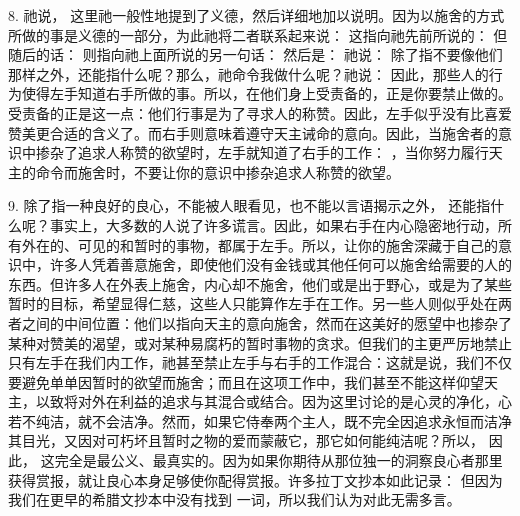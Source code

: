 8.  祂说， 这里祂一般性地提到了义德，然后详细地加以说明。因为以施舍的方式所做的事是义德的一部分，为此祂将二者联系起来说： 这指向祂先前所说的： 但随后的话： 则指向祂上面所说的另一句话： 然后是： 祂说： 除了指不要像他们那样之外，还能指什么呢？那么，祂命令我做什么呢？祂说：  因此，那些人的行为使得左手知道右手所做的事。所以，在他们身上受责备的，正是你要禁止做的。受责备的正是这一点：他们行事是为了寻求人的称赞。因此，左手似乎没有比喜爱赞美更合适的含义了。而右手则意味着遵守天主诫命的意向。因此，当施舍者的意识中掺杂了追求人称赞的欲望时，左手就知道了右手的工作： ，当你努力履行天主的命令而施舍时，不要让你的意识中掺杂追求人称赞的欲望。\par

9.  除了指一种良好的良心，不能被人眼看见，也不能以言语揭示之外， 还能指什么呢？事实上，大多数的人说了许多谎言。因此，如果右手在内心隐密地行动，所有外在的、可见的和暂时的事物，都属于左手。所以，让你的施舍深藏于自己的意识中，许多人凭着善意施舍，即使他们没有金钱或其他任何可以施舍给需要的人的东西。但许多人在外表上施舍，内心却不施舍，他们或是出于野心，或是为了某些暂时的目标，希望显得仁慈，这些人只能算作左手在工作。另一些人则似乎处在两者之间的中间位置：他们以指向天主的意向施舍，然而在这美好的愿望中也掺杂了某种对赞美的渴望，或对某种易腐朽的暂时事物的贪求。但我们的主更严厉地禁止只有左手在我们内工作，祂甚至禁止左手与右手的工作混合：这就是说，我们不仅要避免单单因暂时的欲望而施舍；而且在这项工作中，我们甚至不能这样仰望天主，以致将对外在利益的追求与其混合或结合。因为这里讨论的是心灵的净化，心若不纯洁，就不会洁净。然而，如果它侍奉两个主人，既不完全因追求永恒而洁净其目光，又因对可朽坏且暂时之物的爱而蒙蔽它，那它如何能纯洁呢？所以， 因此， 这完全是最公义、最真实的。因为如果你期待从那位独一的洞察良心者那里获得赏报，就让良心本身足够使你配得赏报。许多拉丁文抄本如此记录： 但因为我们在更早的希腊文抄本中没有找到 一词，所以我们认为对此无需多言。\par

